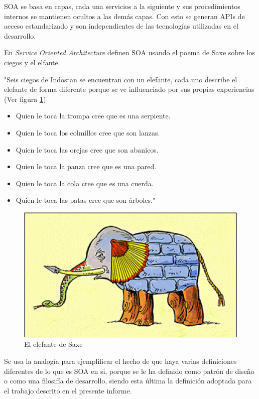     SOA se basa en capas, cada una servicios a la siguiente y sus procedimientos internos se mantienen ocultos a las demás capas. Con esto se generan APIs de acceso estandarizado y son independientes de las tecnologías utilizadas en el desarrollo.
    
    En \textit{Service Oriented Architecture}\cite{SOA-msdn} definen SOA usando el poema de Saxe sobre los ciegos y el elfante.
    
    "Seis ciegos de Indostan se encuentran con un elefante, cada uno describe el elefante de forma diferente porque se ve influenciado por sus propias experiencias (Ver figura \ref{elefante-saxe})
    
    \begin{itemize}
        \item Quien le toca la trompa cree que es una serpiente.
        \item Quien le toca los colmillos cree que son lanzas.
        \item Quien le toca las orejas cree que son abanicos.
        \item Quien le toca la panza cree que es una pared.
        \item Quien le toca la cola cree que es una cuerda.
        \item Quien le toca	las patas cree que son árboles."
    \end{itemize}
    

    \begin{figure}[htbp!]
        \begin{center}
            \includegraphics[width=.8\textwidth]{figures/Elefante}
        \end{center}
        \caption {El elefante de Saxe}
        \label{elefante-saxe}
    \end{figure}

    Se usa la analogía para ejemplificar el hecho de que haya varias definiciones diferentes de lo que es SOA en si, porque se le ha definido como patrón de diseño o como una filosifía de desarrollo, siendo esta última la definición adoptada para el trabajo descrito en el presente informe.
    
